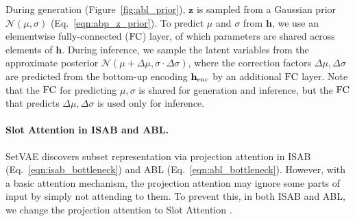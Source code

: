 \documentclass[final]{arxiv/cvpr}
\begin{document}
During generation (Figure~\ref{fig:abl_prior}), $\mathbf{z}$ is sampled from a Gaussian prior $\mathcal{N}(\mu, \sigma)$ (Eq.~\eqref{eqn:abp_z_prior}).
To predict $\mu$ and $\sigma$ from $\mathbf{h}$, we use an elementwise fully-connected ($\textnormal{FC}$) layer, of which parameters are shared across elements of $\mathbf{h}$.
During inference, we sample the latent variables from the approximate posterior $\mathcal{N}(\mu+\Delta\mu, \sigma\cdot\Delta\sigma)$, where the correction factors $\Delta\mu, \Delta\sigma$ are predicted from the bottom-up encoding $\mathbf{h}_\textnormal{enc}$ by an additional $\textnormal{FC}$ layer.
Note that the $\textnormal{FC}$ for predicting $\mu, \sigma$ is shared for generation and inference, but the $\textnormal{FC}$ that predicts $\Delta\mu, \Delta\sigma$ is used only for inference.
\\

\paragraph{Slot Attention in ISAB and ABL.}
SetVAE discovers subset representation via projection attention in ISAB (Eq.~\eqref{eqn:isab_bottleneck}) and ABL (Eq.~\eqref{eqn:abl_bottleneck}).
However, with a basic attention mechanism, the projection attention may ignore some parts of input by simply not attending to them.
To prevent this, in both ISAB and ABL, we change the projection attention to Slot Attention \cite{locatello2020objectcentric}.
\end{document}
